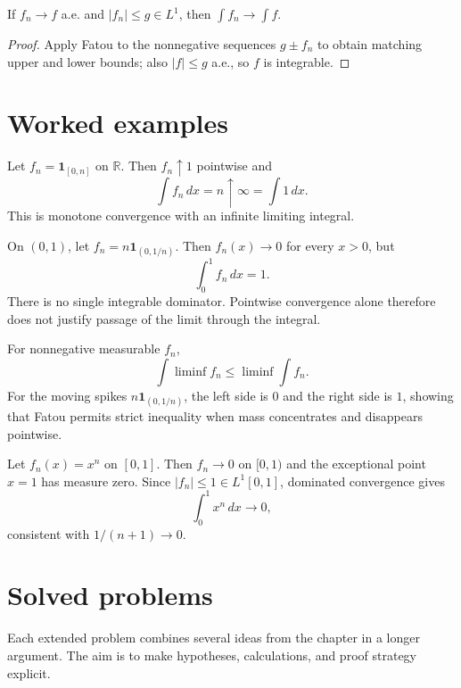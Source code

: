 \begin{theorem}\label{thm:iii04-03}
If $f_n\to f$ a.e. and $|f_n|\le g\in L^1$, then $\int f_n\to\int f$.
\begin{proof}
Apply Fatou to the nonnegative sequences $g\pm f_n$ to obtain matching upper and lower bounds; also $|f|\le g$ a.e., so $f$ is integrable.
\end{proof}
\end{theorem}

\section{Worked examples}

\begin{example}\label{ex:iii04-worked-01}
Let \(f_n=\mathbf1_{[0,n]}\) on \(\mathbb R\). Then \(f_n\uparrow1\)
pointwise and
\[
\int f_n\,dx=n\uparrow\infty=\int1\,dx.
\]
This is monotone convergence with an infinite limiting integral.
\end{example}

\begin{example}\label{ex:iii04-worked-02}
On \((0,1)\), let \(f_n=n\mathbf1_{(0,1/n)}\). Then \(f_n(x)\to0\) for
every \(x>0\), but
\[
\int_0^1 f_n\,dx=1.
\]
There is no single integrable dominator. Pointwise convergence alone therefore
does not justify passage of the limit through the integral.
\end{example}

\begin{example}\label{ex:iii04-worked-03}
For nonnegative measurable \(f_n\),
\[
\int\liminf f_n\le\liminf\int f_n.
\]
For the moving spikes \(n\mathbf1_{(0,1/n)}\), the left side is \(0\) and the
right side is \(1\), showing that Fatou permits strict inequality when mass
concentrates and disappears pointwise.
\end{example}

\begin{example}\label{ex:iii04-worked-04}
Let \(f_n(x)=x^n\) on \([0,1]\). Then \(f_n\to0\) on \([0,1)\) and the
exceptional point \(x=1\) has measure zero. Since \(|f_n|\le1\in L^1[0,1]\),
dominated convergence gives
\[
\int_0^1x^n\,dx\to0,
\]
consistent with \(1/(n+1)\to0\).
\end{example}

\section{Solved problems}
Each extended problem combines several ideas from the chapter in a longer argument. The aim is to make hypotheses, calculations, and proof strategy explicit.

